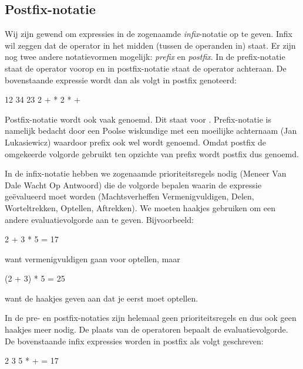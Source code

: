 \begin{cpplstShortInline}
\subsection{Postfix-notatie}
\label{sec:postfix}
Wij zijn gewend om expressies in de zogenaamde \emph{infix}-notatie op te geven.
Infix wil zeggen dat de operator in het midden (tussen de operanden in) staat.
Er zijn nog twee andere notatievormen mogelijk: \emph{prefix} en \emph{postfix}.
In de prefix-notatie staat de operator voorop en in postfix-notatie staat de operator achteraan.
De bovenstaande expressie wordt dan als volgt in postfix genoteerd:

\begin{coutput}
12 34 23 2 + * 2 * +
\end{coutput}

Postfix-notatie wordt ook vaak  genoemd.
Dit staat voor .
Prefix-notatie is namelijk bedacht door een Poolse wiskundige met een moeilijke achternaam (Jan Lukasiewicz) waardoor
prefix ook wel  wordt genoemd.
Omdat postfix de omgekeerde volgorde gebruikt ten opzichte van prefix wordt postfix dus  genoemd.

In de infix-notatie hebben we zogenaamde prioriteitsregels nodig (Meneer Van Dale Wacht Op Antwoord) die de volgorde bepalen waarin de expressie geëvalueerd moet worden (Machtsverheffen Vermenigvuldigen, Delen, Worteltrekken, Optellen, Aftrekken).
We moeten haakjes gebruiken om een andere evaluatievolgorde aan te geven.
Bijvoorbeeld:

\begin{coutput}
2 + 3 * 5 = 17
\end{coutput}

want vermenigvuldigen gaan voor optellen, maar

\begin{coutput}
(2 + 3) * 5 = 25
\end{coutput}

want de haakjes geven aan dat je eerst moet optellen.

In de pre- en postfix-notaties zijn helemaal geen prioriteitsregels en dus ook geen haakjes meer nodig.
De plaats van de operatoren bepaalt de evaluatievolgorde.
De bovenstaande infix expressies worden in postfix als volgt geschreven:

\begin{coutput}
2 3 5 * + = 17
\end{coutput}


\end{cpplstShortInline}
